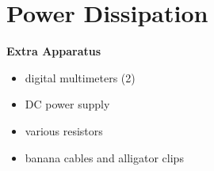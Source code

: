 \section{Power Dissipation}


\bigskip

\textbf{Extra Apparatus}
\begin{itemize}[nosep]
\item digital multimeters (2)
\item DC power supply 
\item various resistors
\item banana cables and alligator clips
\end{itemize}

\bigskip

